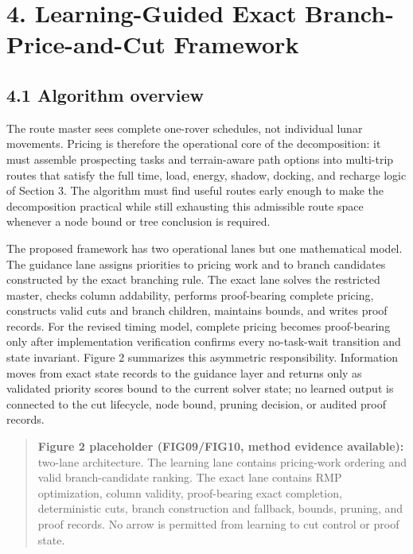 \documentclass[
  11pt,
]{article}
\begin{document}
\hypertarget{learning-guided-exact-branch-price-and-cut-framework}{%
\section{4. Learning-Guided Exact Branch-Price-and-Cut
Framework}\label{learning-guided-exact-branch-price-and-cut-framework}}

\hypertarget{algorithm-overview}{%
\subsection{4.1 Algorithm overview}\label{algorithm-overview}}

The route master sees complete one-rover schedules, not individual lunar
movements. Pricing is therefore the operational core of the
decomposition: it must assemble prospecting tasks and terrain-aware path
options into multi-trip routes that satisfy the full time, load, energy,
shadow, docking, and recharge logic of Section 3. The algorithm must
find useful routes early enough to make the decomposition practical
while still exhausting this admissible route space whenever a node bound
or tree conclusion is required.

The proposed framework has two operational lanes but one mathematical
model. The guidance lane assigns priorities to pricing work and to
branch candidates constructed by the exact branching rule. The exact
lane solves the restricted master, checks column addability, performs
proof-bearing complete pricing, constructs valid cuts and branch
children, maintains bounds, and writes proof records. For the revised
timing model, complete pricing becomes proof-bearing only after
implementation verification confirms every no-task-wait transition and
state invariant. Figure 2 summarizes this asymmetric responsibility.
Information moves from exact state records to the guidance layer and
returns only as validated priority scores bound to the current solver
state; no learned output is connected to the cut lifecycle, node bound,
pruning decision, or audited proof records.

\begin{quote}
\textbf{Figure 2 placeholder (FIG09/FIG10, method evidence available):}
two-lane architecture. The learning lane contains pricing-work ordering
and valid branch-candidate ranking. The exact lane contains RMP
optimization, column validity, proof-bearing exact completion,
deterministic cuts, branch construction and fallback, bounds, pruning,
and proof records. No arrow is permitted from learning to cut control or
proof state.
\end{quote}
\end{document}
